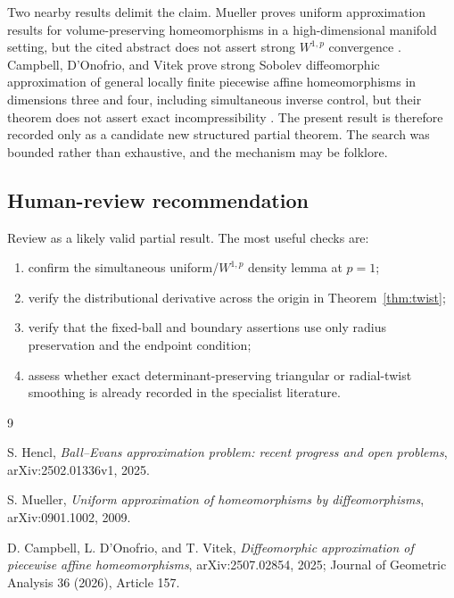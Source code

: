 \documentclass[11pt]{article}
\theoremstyle{remark}
\begin{document}
Two nearby results delimit the claim.  Mueller proves uniform approximation
results for volume-preserving homeomorphisms in a high-dimensional manifold
setting, but the cited abstract does not assert strong $W^{1,p}$ convergence
\cite{Mueller}.  Campbell, D'Onofrio, and Vitek prove strong Sobolev
diffeomorphic approximation of general locally finite piecewise affine
homeomorphisms in dimensions three and four, including simultaneous inverse
control, but their theorem does not assert exact incompressibility
\cite{CDV}.  The present result is therefore recorded only as a candidate new
structured partial theorem.  The search was bounded rather than exhaustive,
and the mechanism may be folklore.

\subsection*{Human-review recommendation}

Review as a likely valid partial result.  The most useful checks are:
\begin{enumerate}[leftmargin=2em]
\item confirm the simultaneous uniform/$W^{1,p}$ density lemma at $p=1$;
\item verify the distributional derivative across the origin in
Theorem~\ref{thm:twist};
\item verify that the fixed-ball and boundary assertions use only radius
preservation and the endpoint condition;
\item assess whether exact determinant-preserving triangular or radial-twist
smoothing is already recorded in the specialist literature.
\end{enumerate}

\begin{thebibliography}{9}

S. Hencl,
\emph{Ball--Evans approximation problem: recent progress and open problems},
arXiv:2502.01336v1, 2025.

S. Mueller,
\emph{Uniform approximation of homeomorphisms by diffeomorphisms},
arXiv:0901.1002, 2009.

D. Campbell, L. D'Onofrio, and T. Vitek,
\emph{Diffeomorphic approximation of piecewise affine homeomorphisms},
arXiv:2507.02854, 2025; Journal of Geometric Analysis 36 (2026), Article 157.

\end{thebibliography}
\end{document}
